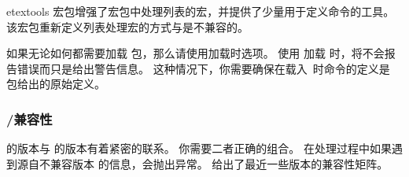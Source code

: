 \begin{marglist}
\item[etextools]
宏包增强了宏包中处理列表的宏，并提供了少量用于定义命令的工具。
该宏包重新定义列表处理宏的方式与\biblatex 是不兼容的。

如果无论如何都需要加载  包，那么请使用加载时选项。
使用  加载 时，将不会报告错误而只是给出警告信息。
这种情况下，你需要确保在载入\biblatex\ 时命令的定义是 包给出的原始定义。


\end{marglist}

\subsubsection{\biber/\biblatex 兼容性}
\label{int:pre:bibercompat}


\biber 的版本与 \biblatex 的版本有着紧密的联系。
你需要二者正确的组合。
在处理过程中如果遇到源自不兼容版本 \biblatex 的信息，\biber 会抛出异常。
 给出了最近一些版本的兼容性矩阵。

